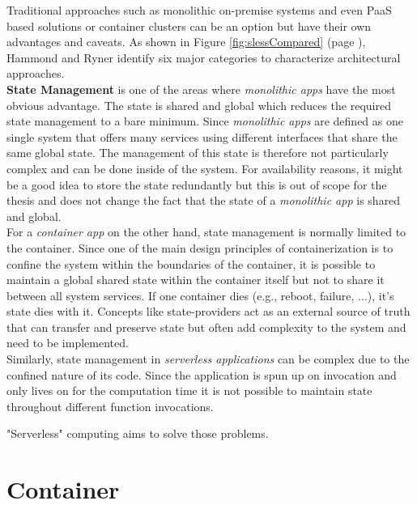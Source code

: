 Traditional approaches such as monolithic on-premise systems and even \acf{PaaS} based solutions or container clusters can be an option but have their own advantages and caveats. As shown in Figure \ref{fig:slessCompared}
(page \pageref{fig:slessCompared}), Hammond and Ryner identify six major categories to characterize architectural approaches.\\
\textbf{State Management} is one of the areas where \textit{monolithic apps} have the most obvious advantage. The state is shared and global which reduces the required state management to a bare minimum. Since \textit{monolithic apps} are defined as one single system that offers many services using different interfaces that share the same global state. \autocite{Villamizar2015EvaluatingCloud} The management of this state is therefore not particularly complex and can be done inside of the system. For availability reasons, it might be a good idea to store the state redundantly but this is out of scope for the thesis and does not change the fact that the state of a \textit{monolithic app} is shared and global.\\
For a \textit{container app} on the other hand, state management is normally limited to the container. Since one of the main design principles of containerization is to confine the system within the boundaries of the container, it is possible to maintain a global shared state within the container itself but not to share it between all system services. If one container dies (e.g., reboot, failure, ...), it's state dies with it. Concepts like state-providers act as an external source of truth that can transfer and preserve state but often add complexity to the system and need to be implemented.\autocite{Ling2004SessionState}\\
Similarly, state management in \textit{serverless applications} can be complex due to the confined nature of its code. Since the application is spun up on invocation and only lives on for the computation time it is not possible to maintain state throughout different function invocations.

"Serverless" computing aims to solve those problems.\autocite{Roberts2016ServerlessArchitectures}


\section{Container}

